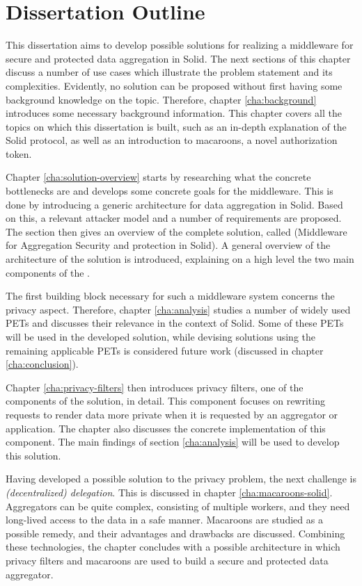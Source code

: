 \section{Dissertation Outline}
\label{sec:outline}
This dissertation aims to develop possible solutions for realizing a middleware for secure and protected data aggregation in Solid. The next sections of this chapter discuss a number of use cases which illustrate the problem statement and its complexities.
Evidently, no solution can be proposed without first having some background knowledge on the topic. Therefore, chapter \ref{cha:background} introduces some necessary background information. This chapter covers all the topics on which this dissertation is built, such as an in-depth explanation of the Solid protocol, as well as an introduction to macaroons, a novel authorization token. 

Chapter \ref{cha:solution-overview} starts by researching what the concrete bottlenecks are and develops some concrete goals for the middleware. This is done by introducing a generic architecture for data aggregation in Solid. Based on this, a relevant attacker model and a number of requirements are proposed. The section then gives an overview of the complete solution, called \middleware{} (Middleware for Aggregation Security and protection in Solid). A general overview of the architecture of the solution is introduced, explaining on a high level the two main components of the \middleware{}.

The first building block necessary for such a middleware system concerns the privacy aspect. Therefore, chapter \ref{cha:analysis} studies a number of widely used \acrlong{PETs} and discusses their relevance in the context of Solid. Some of these \acrshort{PETs} will be used in the developed solution, while devising solutions using the remaining applicable \acrshort{PETs} is considered future work (discussed in chapter \ref{cha:conclusion}).

Chapter \ref{cha:privacy-filters} then introduces privacy filters, one of the components of the solution, in detail. This component focuses on rewriting requests to render data more private when it is requested by an aggregator or application. The chapter also discusses the concrete implementation of this component. The main findings of section \ref{cha:analysis} will be used to develop this solution.

Having developed a possible solution to the privacy problem, the next challenge is \textit{(decentralized) delegation}. This is discussed in chapter \ref{cha:macaroons-solid}. Aggregators can be quite complex, consisting of multiple workers, and they need long-lived access to the data in a safe manner. Macaroons are studied as a possible remedy, and their advantages and drawbacks are discussed. Combining these technologies, the chapter concludes with a possible architecture in which privacy filters and macaroons are used to build a secure and protected data aggregator.

